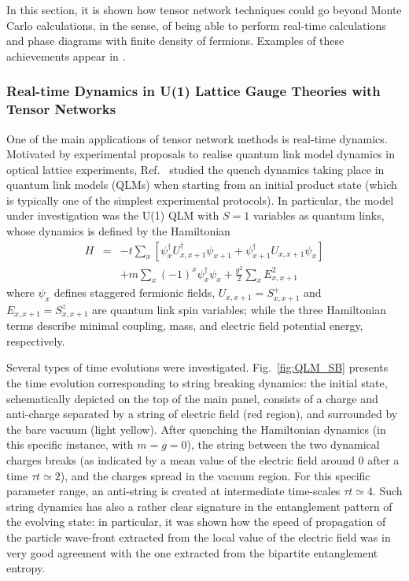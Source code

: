 \documentclass[epj,final]{svjour}
\begin{document}
In this section, it is shown how tensor network techniques could go beyond Monte Carlo calculations, in the sense, of being able to perform real-time calculations and phase diagrams with finite density of fermions. Examples of these achievements appear in \cite{banuls2016thermalmass,Banuls2015,pichler2016real,silvi2017finite,banuls2017density,banuls2017efficient,sala2018pos,tschirsich2019phase}.

\subsubsection{Real-time Dynamics in U(1) Lattice Gauge Theories with Tensor Networks\cite{pichler2016real}}

One of the main applications of tensor network methods is  real-time dynamics. Motivated by experimental proposals to realise quantum link model dynamics in optical lattice experiments, Ref.~\cite{pichler2016real} studied the quench dynamics taking place in quantum link models (QLMs) when starting from an initial product state (which is typically one of the simplest experimental protocols). In particular, the model under investigation was the U(1) QLM with $S=1$ variables as quantum links, whose dynamics is defined by the Hamiltonian
\begin{eqnarray}
 H&=&-t\sum_x \left[ \psi^{\dagger}_x U_{x,x+1}^{\dagger} \psi_{x+1} + \psi^{\dagger}_{x+1} U_{x,x+1} \psi_{x} \right] \nonumber\\
  & &+m\sum_x (-1)^x\psi^{\dagger}_x\psi_x
  +\frac{g^2}{2}\sum_xE^2_{x,x+1}
   \label{eq:Hamiltonian}
\end{eqnarray}
where $\psi_x$ defines staggered fermionic fields, $U_{x,x+1}=S^+_{x,x+1}$ and $E_{x,x+1}=S^z_{x,x+1}$ are quantum link spin variables; while the three Hamiltonian terms describe minimal coupling, mass, and electric field potential energy, respectively. 

Several types of time evolutions were investigated. Fig.~\ref{fig:QLM_SB} presents the time evolution corresponding to string breaking dynamics: the initial state, schematically depicted on the top of the main panel, consists of a charge and anti-charge separated by a string of electric field (red region), and surrounded by the bare vacuum (light yellow). After quenching the Hamiltonian dynamics (in this specific instance, with $m=g=0$), the string between the two dynamical charges breaks (as indicated by a mean value of the electric field around 0 after a time $\tau t\simeq2$), and the charges spread in the vacuum region. For this specific parameter range, an anti-string is created at intermediate time-scales $\tau t\simeq 4$. Such string dynamics has also a rather clear signature in the entanglement pattern of the evolving state: in particular, it was shown how the speed of propagation of the particle wave-front extracted from the local value of the electric field was in very good agreement with the one extracted from the bipartite entanglement entropy.
\end{document}
